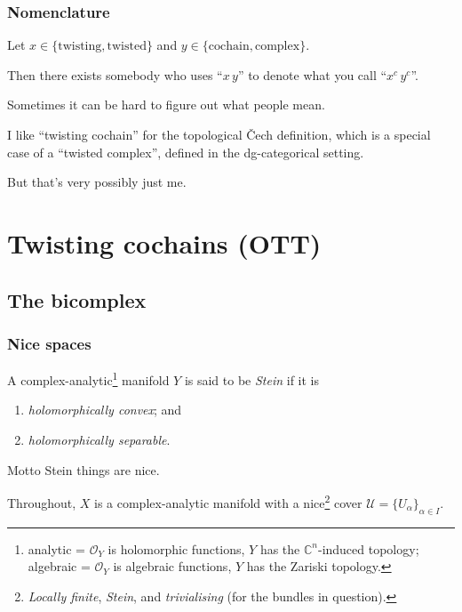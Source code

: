 \documentclass{beamer}
\begin{document}
    \begin{frame}\frametitle{Nomenclature}
        \begin{lemma}
            Let $x\in\{\text{twisting},\text{twisted}\}$ and $y\in\{\text{cochain},\text{complex}\}$.

            Then there exists somebody who uses ``$x\,y$'' to denote what you call ``$x^c\,y^c$''.
        \end{lemma}

        \begin{corollary}
            Sometimes it can be hard to figure out what people mean.
        \end{corollary}
        
        \pause

        I like ``twisting cochain'' for the topological Čech definition, which is a special case of a ``twisted complex'', defined in the dg-categorical setting.

        \pause

        But that's very possibly just me.
    \end{frame}


\section{Twisting cochains (OTT)}

    \subsection{The bicomplex}

        \begin{frame}\frametitle{Nice spaces}
            \begin{definition}
                A complex-analytic\footnote{analytic = $\mathcal{O}_Y$ is holomorphic functions, $Y$ has the $\mathbb{C}^n$-induced topology; algebraic = $\mathcal{O}_Y$ is algebraic functions, $Y$ has the Zariski topology.} manifold $Y$ is said to be \emph{Stein} if it is
                \begin{enumerate}
                    \item \emph{holomorphically convex}; and
                    \item \emph{holomorphically separable}.
                \end{enumerate}
            \end{definition}

            \pause

            \begin{block}{Motto}
                Stein things are nice.
            \end{block}

            \pause

            Throughout, $X$ is a complex-analytic manifold with a nice\footnote<3>{\emph{Locally finite}, \emph{Stein}, and \emph{trivialising} (for the bundles in question).} cover $\mathcal{U}=\{U_\alpha\}_{\alpha\in I}$.
        \end{frame}
\end{document}
